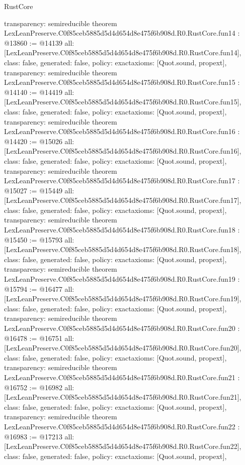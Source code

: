\begin{lexlean}{RustCore}
\begin{coremodule}
{  transparency: semireducible
}
theorem LexLeanPreserve.C0f85ceb5885d5d4d654d8e475f6b908d.R0.RustCore.fun14 : @13860 := @14139 {
  all: [LexLeanPreserve.C0f85ceb5885d5d4d654d8e475f6b908d.R0.RustCore.fun14],
  class: false,
  generated: false,
  policy: exact{axioms: [Quot.sound, propext]},
  transparency: semireducible
}
theorem LexLeanPreserve.C0f85ceb5885d5d4d654d8e475f6b908d.R0.RustCore.fun15 : @14140 := @14419 {
  all: [LexLeanPreserve.C0f85ceb5885d5d4d654d8e475f6b908d.R0.RustCore.fun15],
  class: false,
  generated: false,
  policy: exact{axioms: [Quot.sound, propext]},
  transparency: semireducible
}
theorem LexLeanPreserve.C0f85ceb5885d5d4d654d8e475f6b908d.R0.RustCore.fun16 : @14420 := @15026 {
  all: [LexLeanPreserve.C0f85ceb5885d5d4d654d8e475f6b908d.R0.RustCore.fun16],
  class: false,
  generated: false,
  policy: exact{axioms: [Quot.sound, propext]},
  transparency: semireducible
}
theorem LexLeanPreserve.C0f85ceb5885d5d4d654d8e475f6b908d.R0.RustCore.fun17 : @15027 := @15449 {
  all: [LexLeanPreserve.C0f85ceb5885d5d4d654d8e475f6b908d.R0.RustCore.fun17],
  class: false,
  generated: false,
  policy: exact{axioms: [Quot.sound, propext]},
  transparency: semireducible
}
theorem LexLeanPreserve.C0f85ceb5885d5d4d654d8e475f6b908d.R0.RustCore.fun18 : @15450 := @15793 {
  all: [LexLeanPreserve.C0f85ceb5885d5d4d654d8e475f6b908d.R0.RustCore.fun18],
  class: false,
  generated: false,
  policy: exact{axioms: [Quot.sound, propext]},
  transparency: semireducible
}
theorem LexLeanPreserve.C0f85ceb5885d5d4d654d8e475f6b908d.R0.RustCore.fun19 : @15794 := @16477 {
  all: [LexLeanPreserve.C0f85ceb5885d5d4d654d8e475f6b908d.R0.RustCore.fun19],
  class: false,
  generated: false,
  policy: exact{axioms: [Quot.sound, propext]},
  transparency: semireducible
}
theorem LexLeanPreserve.C0f85ceb5885d5d4d654d8e475f6b908d.R0.RustCore.fun20 : @16478 := @16751 {
  all: [LexLeanPreserve.C0f85ceb5885d5d4d654d8e475f6b908d.R0.RustCore.fun20],
  class: false,
  generated: false,
  policy: exact{axioms: [Quot.sound, propext]},
  transparency: semireducible
}
theorem LexLeanPreserve.C0f85ceb5885d5d4d654d8e475f6b908d.R0.RustCore.fun21 : @16752 := @16982 {
  all: [LexLeanPreserve.C0f85ceb5885d5d4d654d8e475f6b908d.R0.RustCore.fun21],
  class: false,
  generated: false,
  policy: exact{axioms: [Quot.sound, propext]},
  transparency: semireducible
}
theorem LexLeanPreserve.C0f85ceb5885d5d4d654d8e475f6b908d.R0.RustCore.fun22 : @16983 := @17213 {
  all: [LexLeanPreserve.C0f85ceb5885d5d4d654d8e475f6b908d.R0.RustCore.fun22],
  class: false,
  generated: false,
  policy: exact{axioms: [Quot.sound, propext]},
}
\end{coremodule}
\end{lexlean}
